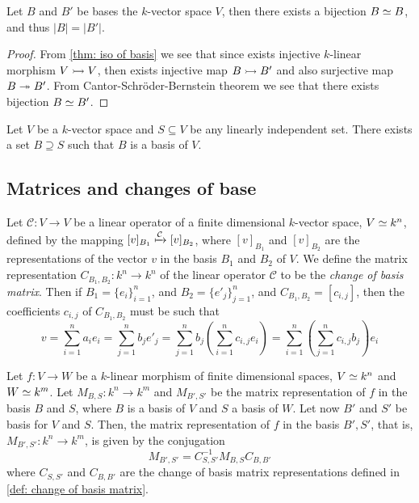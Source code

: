 \begin{lemma}
Let \(B\) and \(B'\) be bases the \(k\)-vector space \(V\), then there exists
a bijection \(B \simeq B\), and thus \(|B| = |B'|\).
\end{lemma}

\begin{proof}
From \cref{thm: iso of basis} we see that since exists injective
\(k\)-linear morphism \(V \rightarrowtail V\), then exists injective map \(B
\rightarrowtail B'\) and also surjective map \(B \twoheadrightarrow B'\). From
Cantor-Schröder-Bernstein theorem we see that there exists bijection \(B \simeq
B'\).
\end{proof}

\begin{proposition}\label{prop: li to basis}
Let \(V\) be a \(k\)-vector space and \(S \subseteq V\) be any linearly
independent set. There exists a set \(B \supseteq S\) such that \(B\) is a
basis of \(V\).
\end{proposition}


\subsection{Matrices and changes of base}

\begin{definition}
\label{def: change of basis matrix}
Let \(\mathcal C : V \to V\) be a linear operator of a finite dimensional
\(k\)-vector space, \(V \simeq k^n\), defined by the mapping \([v]_{B_1}
\xmapsto{\mathcal C} [v]_{B_2}\), where \([v]_{B_1}\) and \([v]_{B_2}\) are the
representations of the vector \(v\) in the basis \(B_1\) and \(B_2\) of \(V\).
We define the matrix representation \(C_{B_1, B_2} : k^n \to k^n\) of the
linear operator \(\mathcal C\) to be the \emph{change of basis matrix}. Then
if \(B_1 = \{e_i\}_{i=1}^n\), and \(B_2 = \{e'_j\}_{j=1}^n\), and \(C_{B_1,
B_2} = [c_{i, j}]\), then the coefficients \(c_{i, j}\) of \(C_{B_1, B_2}\)
must be such that
\[
  v = \sum_{i=1}^n a_i e_i = \sum_{j=1}^n b_j e'_j
  = \sum_{j=1}^n b_j \left( \sum_{i=1}^n c_{i, j} e_i \right)
  = \sum_{i=1}^n \left( \sum_{j=1}^n c_{i, j} b_j \right) e_i
\]
\end{definition}

\begin{proposition}
\label{prop: change of basis, linear morphism}
Let \(f : V \to W\) be a \(k\)-linear morphism of finite dimensional spaces,
\(V \simeq k^n\) and \(W \simeq k^m\). Let \(M_{B, S} : k^n \to k^m\) and \(M_{B',
S'}\) be the matrix representation of \(f\) in the basis \(B\) and \(S\),
where \(B\) is a basis of \(V\) and \(S\) a basis of \(W\). Let now \(B'\) and
\(S'\) be basis for \(V\) and \(S\). Then, the matrix representation of \(f\)
in the basis \(B', S'\), that is, \(M_{B', S'} : k^n \to k^m\), is given by
the conjugation
\[
  M_{B', S'} = C_{S, S'}^{-1} M_{B, S} C_{B, B'}
\]
where \(C_{S, S'}\) and \(C_{B, B'}\) are the change of basis matrix
representations defined in \cref{def: change of basis matrix}.
\end{proposition}

